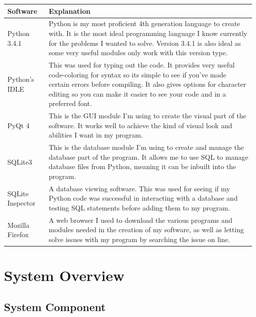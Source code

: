 \begin{center}
    \begin{tabular}{|p{3cm}|p{8cm}|}
	\hline
	\textbf{Software} & \textbf{Explanation} \\ \hline
	{Python 3.4.1} & {Python is my most proficient 4th generation language to create with. It is the most ideal programming language I know currently for the problems I wanted to solve. Version 3.4.1 is also ideal as some very useful modules only work with this version type.} \\ \hline
	{Python's IDLE} & {This was used for typing out the code. It provides very useful code-coloring for syntax so its simple to see if you've made certain errors before compiling. It also gives options for character editing so you can make it easier to see your code and in a preferred font.} \\ \hline
	{PyQt 4} & {This is the GUI module I'm using to create the visual part of the software. It works well to achieve the kind of visual look and abilities I want in my program.} \\ \hline
	{SQLite3} & {This is the database module I'm using to create and manage the database part of the program. It allows me to use SQL to manage database files from Python, meaning it can be inbuilt into the program.} \\ \hline
	{SQLite Inspector} & {A database viewing software. This was used for seeing if my Python code was successful in interacting with a database and testing SQL statements before adding them to my program.} \\ \hline
	{Mozilla Firefox} & {A web browser I used to download the various programs and modules needed in the creation of my software, as well as letting solve issues with my program by searching the issue on line.} \\ \hline

    \end{tabular}
\end{center}

\section{System Overview}

\subsection{System Component}

